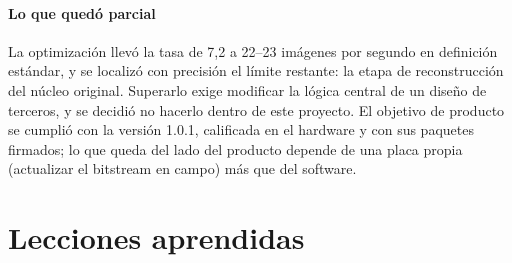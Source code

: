 \paragraph{Lo que quedó parcial}
La optimización llevó la tasa de 7,2 a 22--23 imágenes por segundo en
definición estándar, y se localizó con precisión el límite restante: la
etapa de reconstrucción del núcleo original. Superarlo exige modificar la
lógica central de un diseño de terceros, y se decidió no hacerlo dentro de
este proyecto. El objetivo de producto se cumplió con la versión 1.0.1,
calificada en el hardware y con sus paquetes firmados; lo que queda del
lado del producto depende de una placa propia (actualizar el bitstream en
campo) más que del software.

\section{Lecciones aprendidas}

